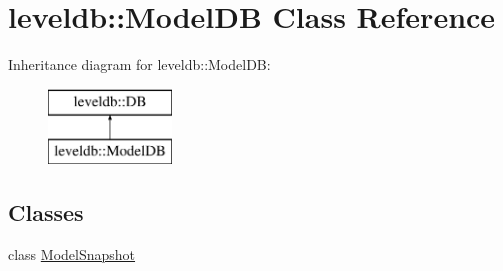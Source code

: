 \hypertarget{classleveldb_1_1_model_d_b}{}\section{leveldb\+:\+:Model\+D\+B Class Reference}
\label{classleveldb_1_1_model_d_b}
Inheritance diagram for leveldb\+:\+:Model\+D\+B\+:\begin{figure}[H]
\begin{center}
\leavevmode
\includegraphics[height=2.000000cm]{classleveldb_1_1_model_d_b}
\end{center}
\end{figure}
\subsection*{Classes}
\begin{DoxyCompactItemize}
\item 
class \hyperlink{classleveldb_1_1_model_d_b_1_1_model_snapshot}{Model\+Snapshot}
\end{DoxyCompactItemize}
